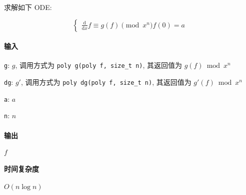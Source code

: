 求解如下 ODE:

\[
    \begin{cases}
        \frac{\mathrm{d}}{\mathrm{d}x}f\equiv g(f)\pmod{x^n}
        f(0)=a
    \end{cases}
\]

\paragraph{输入}

\verb|g|: \(g\), 调用方式为 \verb|poly g(poly f, size_t n)|, 其返回值为 \(g(f)\bmod{x^n}\)

\verb|dg|: \(g'\), 调用方式为 \verb|poly dg(poly f, size_t n)|, 其返回值为 \(g'(f)\bmod{x^n}\)

\verb|a|: \(a\)

\verb|n|: \(n\)

\paragraph{输出}

\(f\)

\paragraph{时间复杂度}

\(O(n\log n)\)

